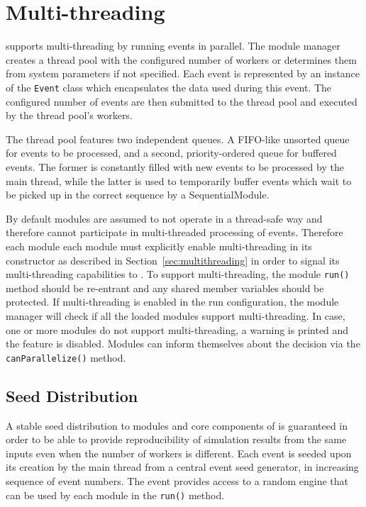 
\section{Multi-threading}
\label{sec:multithreading_approach}
\apsq supports multi-threading by running events in parallel.
The module manager creates a thread pool with the configured number of workers or determines them from system parameters if not specified.
Each event is represented by an instance of the \texttt{Event} class which encapsulates the data used during this event.
The configured number of events are then submitted to the thread pool and executed by the thread pool's workers.

The thread pool features two independent queues.
A FIFO-like unsorted queue for events to be processed, and a second, priority-ordered queue for buffered events.
The former is constantly filled with new events to be processed by the main thread, while the latter is used to temporarily buffer events which wait to be picked up in the correct sequence by a SequentialModule.

By default modules are assumed to not operate in a thread-safe way and therefore cannot participate in multi-threaded processing of events.
Therefore each module each module must explicitly enable multi-threading in its constructor as described in Section~\ref{sec:multithreading} in order to signal its multi-threading capabilities to \apsq.
To support multi-threading, the module \texttt{run()} method should be re-entrant and any shared member variables should be protected.
If multi-threading is enabled in the run configuration, the module manager will check if all the loaded modules support multi-threading.
In case, one or more modules do not support multi-threading, a warning is printed and the feature is disabled. Modules can inform themselves about the decision via the \texttt{canParallelize()} method.

\subsection{Seed Distribution}
A stable seed distribution to modules and core components of \apsq is guaranteed in order to be able to provide reproducibility of simulation results from the same inputs even when the number of workers is different.
Each event is seeded upon its creation by the main thread from a central event seed generator, in increasing sequence of event numbers. The event provides access to a random engine that can be used by each module in the \texttt{run()} method.

